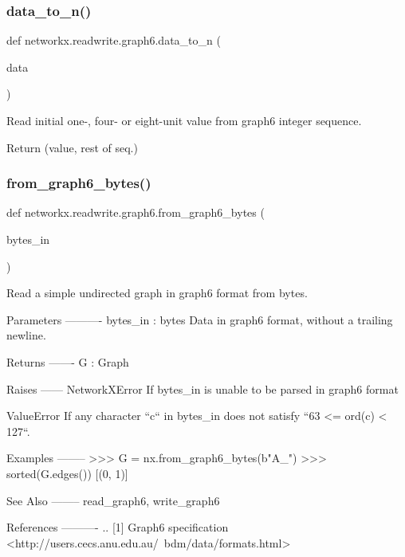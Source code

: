 \subsubsection{\texorpdfstring{data\+\_\+to\+\_\+n()}{data\_to\_n()}}
{\footnotesize\ttfamily def networkx.\+readwrite.\+graph6.\+data\+\_\+to\+\_\+n (\begin{DoxyParamCaption}\item[{}]{data }\end{DoxyParamCaption})}

\begin{DoxyVerb}Read initial one-, four- or eight-unit value from graph6
integer sequence.

Return (value, rest of seq.)\end{DoxyVerb}
 \mbox{\label{namespacenetworkx_1_1readwrite_1_1graph6_a873694b167fb45a5ce7d65bb07d02efb}} 
\subsubsection{\texorpdfstring{from\+\_\+graph6\+\_\+bytes()}{from\_graph6\_bytes()}}
{\footnotesize\ttfamily def networkx.\+readwrite.\+graph6.\+from\+\_\+graph6\+\_\+bytes (\begin{DoxyParamCaption}\item[{}]{bytes\+\_\+in }\end{DoxyParamCaption})}

\begin{DoxyVerb}Read a simple undirected graph in graph6 format from bytes.

Parameters
----------
bytes_in : bytes
   Data in graph6 format, without a trailing newline.

Returns
-------
G : Graph

Raises
------
NetworkXError
    If bytes_in is unable to be parsed in graph6 format

ValueError
    If any character ``c`` in bytes_in does not satisfy
    ``63 <= ord(c) < 127``.

Examples
--------
>>> G = nx.from_graph6_bytes(b"A_")
>>> sorted(G.edges())
[(0, 1)]

See Also
--------
read_graph6, write_graph6

References
----------
.. [1] Graph6 specification
       <http://users.cecs.anu.edu.au/~bdm/data/formats.html>\end{DoxyVerb}
 \mbox{\label{namespacenetworkx_1_1readwrite_1_1graph6_a66aa9946351ad26c99d04c4f79beacae}} 
